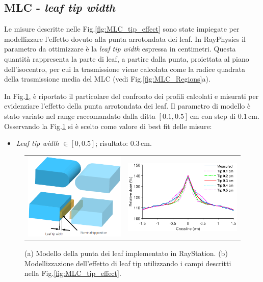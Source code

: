 \subsection{MLC - \textit{leaf tip width}}
Le misure descritte nelle Fig.\ref{fig:MLC_tip_effect} sono state impiegate per modellizzare l'effetto dovuto alla punta arrotondata dei leaf. In RayPhysics il parametro da ottimizzare è la \textit{leaf tip width} espressa in centimetri. Questa quantità rappresenta la parte di leaf, a partire dalla punta, proiettata al piano dell'isocentro, per cui la trasmissione viene calcolata come la radice quadrata della trasmissione media del MLC (vedi Fig.\ref{fig:MLC_Regions}a).

In Fig.\ref{fig:MLC_tip_model}, è riportato il particolare del confronto dei profili calcolati e misurati per evidenziare l'effetto della punta arrotondata dei leaf. Il parametro di modello è stato variato nel range raccomandato dalla ditta $[0.1, 0.5]\,$cm con step di $0.1\,$cm. Osservando la Fig.\ref{fig:MLC_tip_model} si è scelto come valore di best fit delle misure:
\begin{itemize}
\item \textit{Leaf tip width} $\in [0,0.5]$; risultato: $0.3\,$cm.
\end{itemize}

\begin{figure}[!t]
\centering
\begin{tabular}{m{}m{}}
\vspace*{-.3cm}\includegraphics[width=.38\textwidth]{./cap2/MLC_tip_model.png} &
\includegraphics[width=.6\textwidth]{./cap2/MLC_Plots/Abutted/PlotMLC_Tip_modeling.eps}
\end{tabular}
\caption{(a) Modello della punta dei leaf implementato in RayStation. (b) Modellizzazione dell'effetto di leaf tip utilizzando i campi descritti nella Fig.\ref{fig:MLC_tip_effect}.}
\label{fig:MLC_tip_model}
\end{figure}

